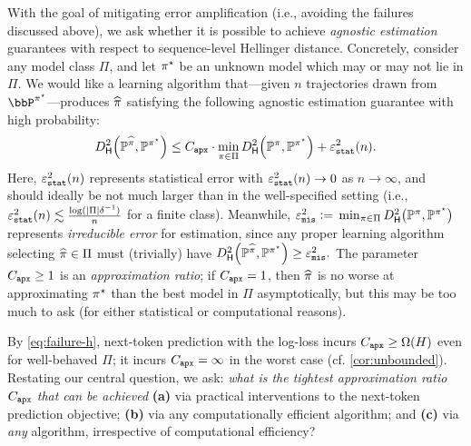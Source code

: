 With the goal of mitigating error amplification (i.e., avoiding the failures discussed above), we ask whether it is possible to %
achieve \emph{agnostic estimation} guarantees with respect to
sequence-level Hellinger distance. Concretely, consider any
model class $\Pi$, and let $\pi^{\star}$ be an unknown model
which may or may not lie in $\Pi$. We would like a learning algorithm
that---given $n$ \iid trajectories drawn from $\bbP^{\pistar}$---produces $\widehat{\pi}$ satisfying the following agnostic estimation guarantee with high probability:\loose
\begin{equation} \Dhels{\BP^{\pihat}}{\BP^{\pistar}} \leq \Capx \cdot \min_{\pi\in\Pi} \Dhels{\BP^{\pi}}{\BP^{\pistar}} + \vepsstatsn.
\label{eq:hels-goal-intro}
\end{equation}
Here, $\varepsilon_{\texttt{stat}}^2(n)$ represents statistical error with
$\varepsilon_{\texttt{stat}}^2(n)\to{}0$ as $n\to\infty$, and should ideally be not much
larger than in the well-specified setting (i.e.,
$\varepsilon_{\texttt{stat}}^2(n)\lesssim\frac{\log(\left\lvert\Pi\right\rvert\delta^{-1})}{n}$ for a
finite class). Meanwhile, $\vepsmis^2\ldef{}\min_{\pi\in\Pi} \Dhels{\BP^{\pi}}{\BP^{\pistar}}$ represents \emph{irreducible error} for
estimation, since any proper learning algorithm selecting
$\widehat{\pi}\in\Pi$ must (trivially) have
$\Dhels{\BP^{\pihat}}{\BP^{\pistar}} \geq  \vepsmis^2.$
The parameter $C_{\texttt{apx}}\geq{}1$ is an \emph{approximation
ratio}; if $C_{\texttt{apx}}=1$, then $\widehat{\pi}$ is no worse at approximating
$\pi^{\star}$ than the best model in $\Pi$
asymptotically, but this may be too much to ask (for either statistical
or computational reasons).

By \cref{eq:failure-h}, next-token prediction with the log-loss incurs $C_{\texttt{apx}} \geq \Omega(H)$ even for well-behaved $\Pi$; it incurs $C_{\texttt{apx}}=\infty$ in the worst case (cf. \cref{cor:unbounded}). %
Restating our central question, we ask: \emph{what is the tightest
  approximation ratio $C_{\texttt{apx}}$ that can be achieved} \textbf{(a)} via practical interventions to the next-token prediction
    objective; \textbf{(b)}  via any computationally efficient algorithm; and \textbf{(c)} via \emph{any} algorithm, irrespective of
    computational efficiency? 












